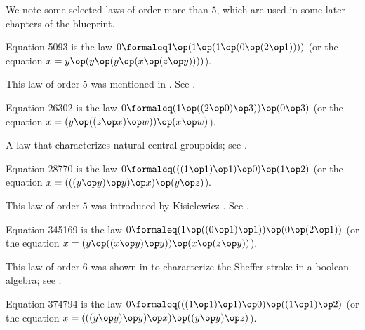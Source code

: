We note some selected laws of order more than $5$, which are used in some later chapters of the blueprint.

\begin{definition}[Equation 5093]
  \label{eq5093}\leanok
  Equation 5093 is the law $0  \formaleq 1 \op (1 \op (1 \op (0 \op (2 \op 1))))$ (or the equation $x = y \op (y \op (y \op (x \op (z \op y))))$).
\end{definition}

This law of order $5$ was mentioned in \cite{Kisielewicz2}.  See .

\begin{definition}[Equation 26302]
  \label{eq26302}
  Equation 26302 is the law $0  \formaleq (1 \op ((2 \op 0) \op 3)) \op (0 \op 3)$ (or the equation $x = (y \op ((z \op x) \op w)) \op (x \op w)$).
\end{definition}

A law that characterizes natural central groupoids; see .

\begin{definition}[Equation 28770]
  \label{eq28770}\leanok
  Equation 28770 is the law $0  \formaleq  (((1 \op 1) \op 1) \op 0) \op (1 \op 2)$ (or the equation $x = (((y \op y) \op y) \op x) \op (y \op z)$).
\end{definition}

This law of order $5$ was introduced by Kisielewicz \cite{Kisielewicz}. See .

\begin{definition}[Equation 345169]
  \label{eq345169}
  Equation 345169 is the law $0  \formaleq  (1 \op ((0 \op 1) \op 1)) \op (0 \op (2 \op 1))$ (or the equation $x = (y \op ((x \op y) \op y)) \op (x \op (z \op y))$).
\end{definition}

This law of order $6$ was shown in \cite{mccune_et_al} to characterize the Sheffer stroke in a boolean algebra; see .

\begin{definition}[Equation 374794]
  \leanok
  \label{eq374794}
  Equation 374794 is the law $0  \formaleq  (((1 \op 1) \op 1) \op 0) \op ((1 \op 1) \op 2)$ (or the equation $x = (((y \op y) \op y) \op x) \op ((y \op y) \op z)$).
\end{definition}

